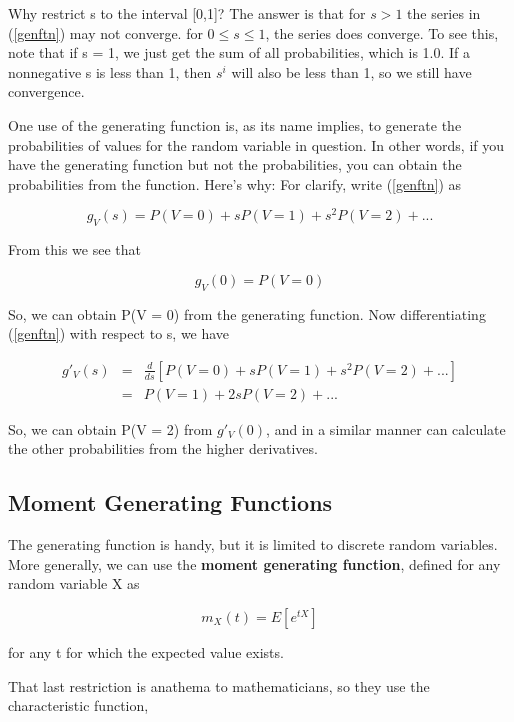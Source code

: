 Why restrict s to the interval [0,1]?  The answer is that for $s > 1$
the series in (\ref{genftn}) may not converge.  for $0 \leq s \leq 1$,
the series does converge.  To see this, note that if s = 1, we just get
the sum of all probabilities, which is 1.0.  If a nonnegative s is less
than 1, then $s^i$ will also be less than 1, so we still have
convergence.

One use of the generating function is, as its name implies, to generate
the probabilities of values for the random variable in question.  In
other words, if you have the generating function but not the
probabilities, you can obtain the probabilities from the function.
Here's why:  For clarify, write (\ref{genftn}) as

\begin{equation}
g_V(s) = P(V=0) + s P(V=1) + s^2 P(V=2) + ...  
\end{equation}

From this we see that 

\begin{equation}
g_V(0) = P(V = 0)
\end{equation}

So, we can obtain P(V = 0) from the generating function.  Now
differentiating (\ref{genftn}) with respect to s, we have

\begin{eqnarray}
g'_V(s) &=&
\frac{d}{ds} \left [ P(V=0) + s P(V=1) + s^2 P(V=2) + ...  \right ]
\nonumber \\
&=&
P(V=1) + 2s P(V=2) + ...  
\end{eqnarray}

So, we can obtain P(V = 2) from $g'_V(0)$, and in a similar manner can
calculate the other probabilities from the higher derivatives.

\subsection{Moment Generating Functions}

The generating function is handy, but it is limited to discrete random
variables.  More generally, we can use the {\bf moment generating
function}, defined for any random variable X as

\begin{equation}
\label{momgen}
m_X(t) = E[e^{tX}] 
\end{equation}

for any t for which the expected value exists.

That last restriction is anathema to mathematicians, so they use the
characteristic function, 

